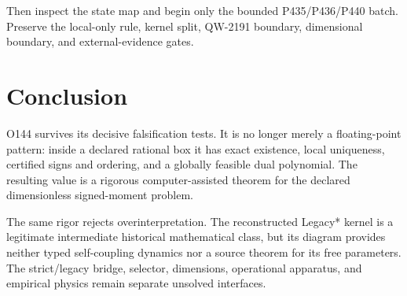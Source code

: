 \documentclass[11pt,a4paper]{article}
\begin{document}
Then inspect the state map and begin only the bounded P435/P436/P440 batch.
Preserve the local-only rule, kernel split, QW-2191 boundary, dimensional
boundary, and external-evidence gates.

\section{Conclusion}

O144 survives its decisive falsification tests. It is no longer merely a
floating-point pattern: inside a declared rational box it has exact existence,
local uniqueness, certified signs and ordering, and a globally feasible dual
polynomial. The resulting value is a rigorous computer-assisted theorem for
the declared dimensionless signed-moment problem.

The same rigor rejects overinterpretation. The reconstructed Legacy* kernel is
a legitimate intermediate historical mathematical class, but its diagram
provides neither typed self-coupling dynamics nor a source theorem for its free
parameters. The strict/legacy bridge, selector, dimensions, operational
apparatus, and empirical physics remain separate unsolved interfaces.
\end{document}
